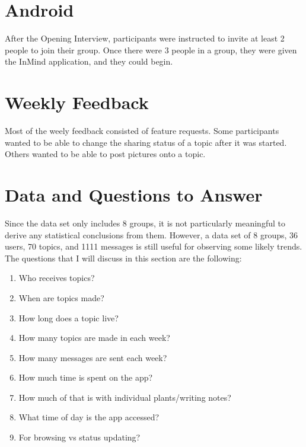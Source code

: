 \section{Android}
  After the Opening Interview, participants were instructed to invite
  at least 2 people to join their group.
  Once there were 3 people in a group,
  they were given the InMind application,
  and they could begin.

  \section{Weekly Feedback}
  Most of the weely feedback consisted of feature requests.
  Some participants wanted to be able to change the sharing status
  of a topic after it was started.
  Others wanted to be able to post pictures onto a topic.

  \section{Data and Questions to Answer}
    Since the data set only includes 8 groups,
    it is not particularly meaningful to derive any statistical conclusions
    from them.
    However, a data set of 8 groups, 36 users, 70 topics, and 1111 messages
    is still useful for observing some likely trends.
    The questions that I will discuss in this section are the following:
    \begin{enumerate}
      \item Who receives topics?
      \item When are topics made?
      \item How long does a topic live?
      \item How many topics are made in each week?
      \item How many messages are sent each week?
      \item How much time is spent on the app?
      \item How much of that is with individual plants/writing notes?
      \item What time of day is the app accessed?
      \item For browsing vs status updating?
    \end{enumerate}

